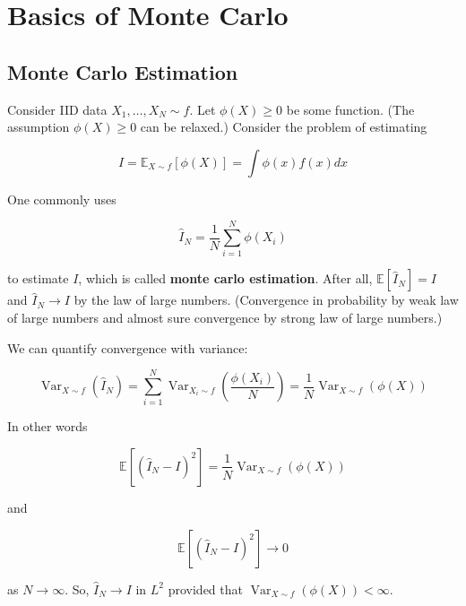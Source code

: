 \chapter{Basics of Monte Carlo}

\section{Monte Carlo Estimation}

\begin{definition}
    Consider IID data $X_{1}, \ldots, X_{N} \sim f$.
    Let $\phi(X) \geq 0$ be some function. (The assumption $\phi(X) \geq 0$ can be relaxed.)
    Consider the problem of estimating

    $$
    I=\mathbb{E}_{X \sim f}[\phi(X)]=\int \phi(x) f(x) d x
    $$

    One commonly uses

    $$
    \hat{I}_{N}=\frac{1}{N} \sum_{i=1}^{N} \phi\left(X_{i}\right)
    $$

    to estimate $I$, which is called \textbf{monte carlo estimation}.
    After all, $\mathbb{E}\left[\hat{I}_{N}\right]=I$ and $\hat{I}_{N} \rightarrow I$ by the law of large numbers.
    (Convergence in probability by weak law of large numbers and almost sure convergence by strong law of large numbers.)
\end{definition}

\begin{concept}
    We can quantify convergence with variance:

    $$
    \operatorname{Var}_{X \sim f}\left(\hat{I}_{N}\right)=\sum_{i=1}^{N} \operatorname{Var}_{X_{i} \sim f}\left(\frac{\phi\left(X_{i}\right)}{N}\right)=\frac{1}{N} \operatorname{Var}_{X \sim f}(\phi(X))
    $$

    In other words

    $$
    \mathbb{E}\left[\left(\hat{I}_{N}-I\right)^{2}\right]=\frac{1}{N} \operatorname{Var}_{X \sim f}(\phi(X))
    $$

    and

    $$
    \mathbb{E}\left[\left(\hat{I}_{N}-I\right)^{2}\right] \rightarrow 0
    $$

    as $N \rightarrow \infty$.
    So, $\hat{I}_{N} \rightarrow I$ in $L^2$ provided that $\operatorname{Var}_{X \sim f}(\phi(X)) < \infty$.
\end{concept}

